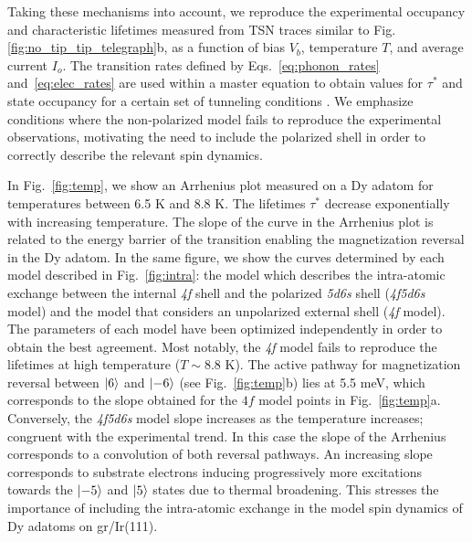 \documentclass[
reprint,amsmath,amssymb,aps]{revtex4-2}
\begin{document}
Taking these mechanisms into account, we reproduce the experimental occupancy and characteristic lifetimes measured from TSN traces similar to Fig. \ref{fig:no_tip_tip_telegraph}b, as a function of bias $V_{b}$, temperature $T$, and average current $I_{o}$. The transition rates defined by Eqs.~\ref{eq:phonon_rates} and~\ref{eq:elec_rates} are used within a master equation to obtain values for $\tau^*$ and state occupancy for a certain set of tunneling conditions \cite{delgado2010,Khajetoorians2013,loth2010,cervetti2016}. We emphasize conditions where the non-polarized model fails to reproduce the experimental observations, motivating the need to include the polarized shell in order to correctly describe the relevant spin dynamics.

In Fig.~\ref{fig:temp}, we show an Arrhenius plot measured on a Dy adatom for temperatures between 6.5 K and 8.8 K. The lifetimes $\tau^*$ decrease exponentially with increasing temperature. The slope of the curve in the Arrhenius plot is related to the energy barrier of the transition enabling the magnetization reversal in the Dy adatom. In the same figure, we show the curves determined by each model described in Fig.~\ref{fig:intra}: the model which describes the intra-atomic exchange between the internal \textit{4f} shell and the polarized \textit{5d6s} shell (\textit{4f5d6s} model) and the model that considers an unpolarized external shell (\textit{4f} model). The parameters of each model have been optimized independently in order to obtain the best agreement. Most notably, the \textit{4f} model fails to reproduce the lifetimes at high temperature ($T\sim 8.8$ K). The active pathway for magnetization reversal between $\ket{6}$ and $\ket{-6}$ (see Fig.~\ref{fig:temp}b) lies at 5.5 meV, which corresponds to the slope obtained for the $4f$ model points in Fig.~\ref{fig:temp}a. Conversely, the \textit{4f5d6s} model slope increases as the temperature increases; congruent with the experimental trend. In this case the slope of the Arrhenius corresponds to a convolution of both reversal pathways. An increasing slope corresponds to substrate electrons inducing progressively more excitations towards the $\ket{-5}$ and $\ket{5}$ states due to thermal broadening. This stresses the importance of including the intra-atomic exchange in the model spin dynamics of Dy adatoms on gr/Ir(111).
\end{document}

